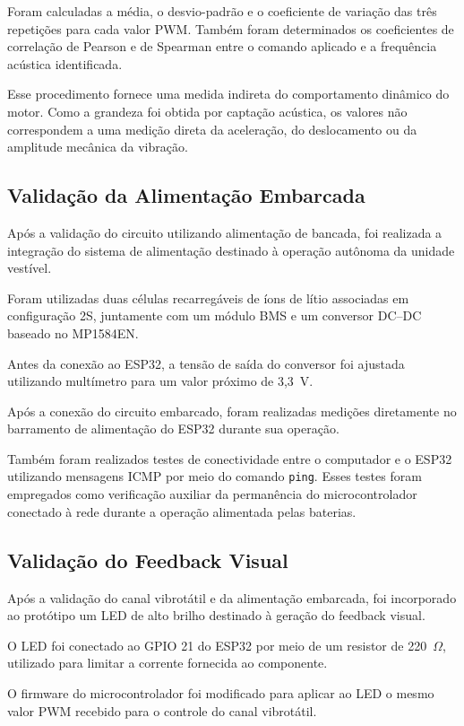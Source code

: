 Foram calculadas a média, o desvio-padrão e o coeficiente de variação das três repetições para cada valor PWM. Também foram determinados os coeficientes de correlação de Pearson e de Spearman entre o comando aplicado e a frequência acústica identificada.

Esse procedimento fornece uma medida indireta do comportamento dinâmico do motor. Como a grandeza foi obtida por captação acústica, os valores não correspondem a uma medição direta da aceleração, do deslocamento ou da amplitude mecânica da vibração.


\subsection{Validação da Alimentação Embarcada}

Após a validação do circuito utilizando alimentação de bancada, foi realizada a integração do sistema de alimentação destinado à operação autônoma da unidade vestível.

Foram utilizadas duas células recarregáveis de íons de lítio associadas em configuração 2S, juntamente com um módulo BMS e um conversor DC--DC baseado no MP1584EN.

Antes da conexão ao ESP32, a tensão de saída do conversor foi ajustada utilizando multímetro para um valor próximo de 3,3~V.

Após a conexão do circuito embarcado, foram realizadas medições diretamente no barramento de alimentação do ESP32 durante sua operação.

Também foram realizados testes de conectividade entre o computador e o ESP32 utilizando mensagens ICMP por meio do comando \texttt{ping}. Esses testes foram empregados como verificação auxiliar da permanência do microcontrolador conectado à rede durante a operação alimentada pelas baterias.

\subsection{Validação do Feedback Visual}

Após a validação do canal vibrotátil e da alimentação embarcada, foi incorporado ao protótipo um LED de alto brilho destinado à geração do feedback visual.

O LED foi conectado ao GPIO 21 do ESP32 por meio de um resistor de 220~$\Omega$, utilizado para limitar a corrente fornecida ao componente.

O firmware do microcontrolador foi modificado para aplicar ao LED o mesmo valor PWM recebido para o controle do canal vibrotátil.

